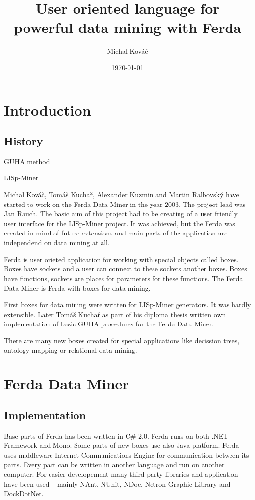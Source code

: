 \documentclass{article}
\author{Michal Kov\'{a}\v{c}}
\title{User oriented language for powerful data mining with Ferda}
\date{\today}
\begin{document}
\section{Introduction}
\subsection{History}
GUHA method

LISp-Miner

Michal Kov\'{a}\v{c}, Tom\'{a}\v{s} Kucha\v{r}, Alexander Kuzmin and Martin Ralbovsk\'{y} have started to work on the Ferda Data Miner in the year 2003. The project lead was Jan Rauch. The basic aim of this project had to be creating of a user friendly user interface for the LISp-Miner project. It was achieved, but the Ferda was created in mind of future extensions and main parts of the application are independend on data mining at all.

Ferda is user orieted application for working with special objects called boxes. Boxes have sockets and a user can connect to these sockets another boxes. Boxes have functions, sockets are places for parameters for these functions. The Ferda Data Miner is Ferda with boxes for data mining.

First boxes for data mining were written for LISp-Miner generators. It was hardly extensible. Later Tom\'{a}\v{s} Kucha\v{r} as part of his diploma thesis written own implementation of basic GUHA procedures for the Ferda Data Miner.

There are many new boxes created for special applications like decission trees, ontology mapping or relational data mining.

\section{Ferda Data Miner}
\subsection{Implementation}

Base parts of Ferda has been written in C\# 2.0. Ferda runs on both .NET Framework and Mono. Some parts of new boxes use also Java platform. Ferda uses middleware Internet Communications Engine for communication between its parts. Every part can be written in another language and run on another computer. For easier developement many third party libraries and application have been used -- mainly NAnt, NUnit, NDoc, Netron Graphic Library and DockDotNet. 
\end{document}
